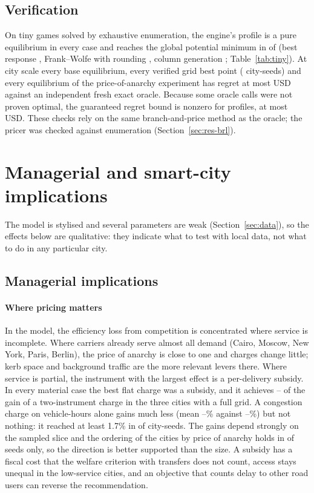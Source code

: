 \documentclass[preprint,12pt]{elsarticle}
\theoremstyle{definition}
\theoremstyle{remark}
\begin{document}
\subsection{Verification}\label{sec:res-verif}

On \TinyN{} tiny games solved by exhaustive enumeration, the engine's profile is a pure equilibrium in every case and reaches the global potential minimum in \TinyZMCglobal{} of \TinyN{} (best response \TinyBRglobal, Frank--Wolfe with rounding \TinyFWglobal, column generation \TinyCGglobal; Table~\ref{tab:tiny}). At city scale every base equilibrium, every verified grid best point (\VerBestN{} city-seeds) and every equilibrium of the price-of-anarchy experiment has regret at most \ExRegretFreshMax{} USD against an independent fresh exact oracle. Because some oracle calls were not proven optimal, the guaranteed regret bound is nonzero for \ExBoundN{} profiles, at most \ExBoundMax{} USD. These checks rely on the same branch-and-price method as the oracle; the pricer was checked against enumeration (Section~\ref{sec:res-brl}).


\section{Managerial and smart-city implications}\label{sec:implications}

The model is stylised and several parameters are weak (Section~\ref{sec:data}), so the effects below are qualitative: they indicate what to test with local data, not what to do in any particular city.

\subsection{Managerial implications}

\paragraph{Where pricing matters} In the model, the efficiency loss from competition is concentrated where service is incomplete. Where carriers already serve almost all demand (Cairo, Moscow, New York, Paris, Berlin), the price of anarchy is close to one and charges change little; kerb space and background traffic are the more relevant levers there. Where service is partial, the instrument with the largest effect is a per-delivery subsidy. In every material case the best flat charge was a subsidy, and it achieves \TenShareLondon--\TenShareBuenosAires{} of the gain of a two-instrument charge in the three cities with a full grid. A congestion charge on vehicle-hours alone gains much less (mean \TenCongMeanMin--\TenCongMeanMax\% against \TenDelMeanMin--\TenDelMeanMax\%) but not nothing: it reached at least 1.7\% in \TenCongHiTotal{} of \TenCongHiDen{} city-seeds. The gains depend strongly on the sampled slice and the ordering of the cities by price of anarchy holds in \TenPoaOrderAll{} of \TenPoaOrderN{} seeds only, so the direction is better supported than the size. A subsidy has a fiscal cost that the welfare criterion with transfers does not count, access stays unequal in the low-service cities, and an objective that counts delay to other road users can reverse the recommendation.
\end{document}
